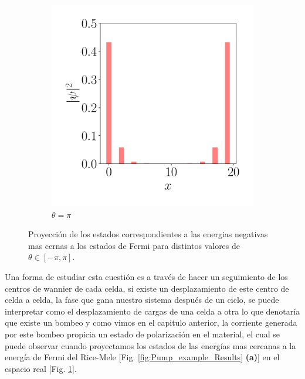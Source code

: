 \begin{figure}[tbh!]
\begin{subfigure}[b!]{0.2 \textwidth}
    \end{subfigure}\hspace*{-0.9em}
    \begin{subfigure}[b!]{0.2 \textwidth}
        \caption*{$\theta=\pi$}
        \includegraphics[width=\textwidth]{Imagenes/Shh_images/proyection_4.pdf}
    \end{subfigure}
       \caption{Proyección de los estados correspondientes a las energias negativas mas cernas a los estados de Fermi para distintos valores de $\theta \in [-\pi, \pi]$. }
    \label{fig:pump_RM_proyection}
\end{figure}

Una forma de estudiar esta cuestión es a través de hacer un seguimiento de los centros de wannier de cada celda, si existe un desplazamiento de este centro de celda a celda, la fase que gana nuestro sistema después de un ciclo, se puede interpretar como el desplazamiento de cargas de una celda a otra lo que denotaría que existe un bombeo y como vimos en el capitulo anterior, la corriente generada por este bombeo propicia un estado de polarización en el material, el cual se puede observar cuando proyectamos los estados de las energías mas cercanas a la energía de Fermi del Rice-Mele [Fig. \ref{fig:Pump_example_Results} \textbf{(a)}] en el espacio real [Fig. \ref{fig:pump_RM_proyection}].


